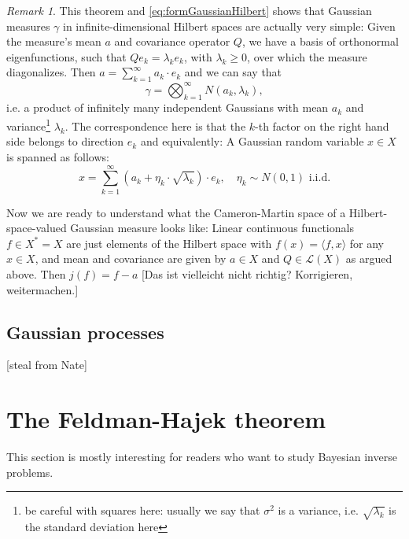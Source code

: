 \documentclass{scrartcl}
\theoremstyle{definition}
\theoremstyle{remark}
\newtheorem{remark}{Remark}
\newcommand{\ednote}[1]{{\color{red}[#1]}}
\begin{document}
\begin{itemize}
\begin{remark}
This theorem and \eqref{eq:formGaussianHilbert} shows that Gaussian measures $\gamma$ in infinite-dimensional Hilbert spaces are actually very simple: Given the measure's mean $a$ and covariance operator $Q$, we have a basis of orthonormal eigenfunctions, such that $Qe_k = \lambda_k e_k$, with $\lambda_k \geq 0$, over which the measure diagonalizes. Then $a = \sum_{k=1}^\infty a_k\cdot e_k$ and we can say that
\begin{displaymath}
\gamma = \bigotimes_{k=1}^\infty N(a_k, \lambda_k),
\end{displaymath}
i.e. a product of infinitely many independent Gaussians with mean $a_k$ and variance\footnote{be careful with squares here: usually we say that $\sigma^2$ is a variance, i.e. $\sqrt{\lambda_k}$ is the standard deviation here} $\lambda_k$. The correspondence here is that the $k$-th factor on the right hand side belongs to direction $e_k$ and equivalently: A Gaussian random variable $x\in X$ is spanned as follows:
\begin{equation}
x = \sum_{k=1}^\infty (a_k + \eta_k\cdot \sqrt{\lambda_k})\cdot e_k,\quad \eta_k \sim N(0,1) \text{ i.i.d.}
\end{equation}
\end{remark}

Now we are ready to understand what the Cameron-Martin space of a Hilbert-space-valued Gaussian measure looks like: Linear continuous functionals $f\in X^* = X$ are just elements of the Hilbert space with $f(x) = \langle f, x\rangle$ for any $x\in X$, and mean and covariance are given by $a\in X$ and $Q\in \mathcal L(X)$ as argued above. Then $j(f) = f-a$ \ednote{Das ist vielleicht nicht richtig? Korrigieren, weitermachen.}

\end{itemize}
\subsection{Gaussian processes} \ednote{steal from Nate}
\section{The Feldman-Hajek theorem}
This section is mostly interesting for readers who want to study Bayesian inverse problems.
\end{document}
